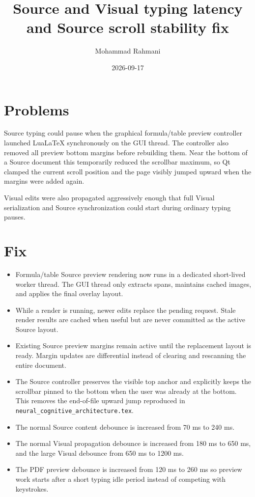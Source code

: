 \documentclass[a4paper]{article}
\title{Source and Visual typing latency and Source scroll stability fix}
\date{2026-09-17}
\author{Mohammad Rahmani}
\begin{document}
   \maketitle

   \section{Problems}
      Source typing could pause when the graphical formula/table preview controller
      launched LuaLaTeX synchronously on the GUI thread. The controller also removed
      all preview bottom margins before rebuilding them. Near the bottom of a Source
      document this temporarily reduced the scrollbar maximum, so Qt clamped the
      current scroll position and the page visibly jumped upward when the margins
      were added again.

      Visual edits were also propagated aggressively enough that full Visual
      serialization and Source synchronization could start during ordinary typing
      pauses.

   \section{Fix}
      \begin{itemize}
         \item Formula/table Source preview rendering now runs in a dedicated
         short-lived worker thread. The GUI thread only extracts spans, maintains
         cached images, and applies the final overlay layout.
         \item While a render is running, newer edits replace the pending request.
         Stale render results are cached when useful but are never committed as the
         active Source layout.
         \item Existing Source preview margins remain active until the replacement
         layout is ready. Margin updates are differential instead of clearing and
         rescanning the entire document.
         \item The Source controller preserves the visible top anchor and explicitly
         keeps the scrollbar pinned to the bottom when the user was already at the
         bottom. This removes the end-of-file upward jump reproduced in
         \texttt{neural\_cognitive\_architecture.tex}.
         \item The normal Source content debounce is increased from 70 ms to 240 ms.
         \item The normal Visual propagation debounce is increased from 180 ms to
         650 ms, and the large Visual debounce from 650 ms to 1200 ms.
         \item The PDF preview debounce is increased from 120 ms to 260 ms so preview
         work starts after a short typing idle period instead of competing with
         keystrokes.
      \end{itemize}
\end{document}
